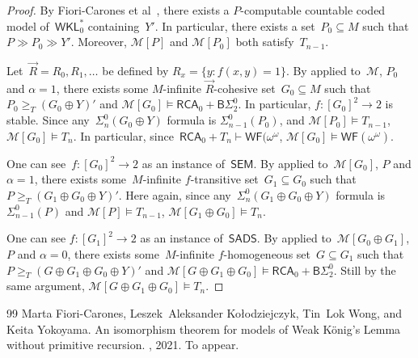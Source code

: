 \documentclass{article}
\numberwithin{theorem}{section}
\newcommand{\RCA}{\mathsf{RCA}}
\newcommand{\WKL}{\mathsf{WKL}}
\newcommand{\SEM}{\mathsf{SEM}}
\newcommand{\SADS}{\mathsf{SADS}}
\newcommand{\BSig}{\mathsf{B}\Sigma^0}
\newcommand{\WF}{\mathsf{WF}}
\newcommand{\M}{\mathcal{M}}
\begin{document}
\begin{proof}
By Fiori-Carones et al~\cite[Lemma 3.2]{fiori2021isomorphism}, there exists a $P$-computable countable coded model of~$\WKL_0^*$ containing~$Y'$.
In particular, there exists a set~$P_0 \subseteq M$ such that $P \gg P_0 \gg Y'$. Moreover, $\M[P]$ and $\M[P_0]$ both satisfy~$T_{n-1}$.

Let~$\vec{R} = R_0, R_1, \dots$ be defined by $R_x = \{ y : f(x, y) = 1 \}$.
By  applied to~$\M$, $P_0$ and $\alpha = 1$, there exists some $M$-infinite $\vec{R}$-cohesive set~$G_0 \subseteq M$ such that $P_0 \geq_T (G_0 \oplus Y)'$ and $\M[G_0] \models \RCA_0 + \BSig_2$.  In particular, $f : [G_0]^2 \to 2$ is stable.
Since any~$\Sigma^0_n(G_0 \oplus Y)$ formula is $\Sigma^0_{n-1}(P_0)$, and $\M[P_0] \models T_{n-1}$, $\M[G_0] \models T_n$. In particular, since~$\RCA_0 + T_n \vdash \WF(\omega^\omega$, $\M[G_0] \models \WF(\omega^\omega)$.

One can see~$f : [G_0]^2 \to 2$ as an instance of~$\SEM$.
By  applied to~$\M[G_0]$, $P$ and $\alpha = 1$, there exists some~$M$-infinite $f$-transitive set~$G_1 \subseteq G_0$ such that $P \geq_T (G_1 \oplus G_0 \oplus Y)'$.
Here again, since any~$\Sigma^0_n(G_1 \oplus G_0 \oplus Y)$ formula is $\Sigma^0_{n-1}(P)$ and $\M[P] \models T_{n-1}$, $\M[G_1 \oplus G_0] \models T_n$. 

One can see $f : [G_1]^2 \to 2$ as an instance of~$\SADS$.
By  applied to~$\M[G_0 \oplus G_1]$, $P$ and $\alpha = 0$, there exists some~$M$-infinite $f$-homogeneous set~$G \subseteq G_1$ such that $P \geq_T (G \oplus G_1 \oplus G_0 \oplus Y)'$ and $\M[G \oplus G_1 \oplus G_0] \models \RCA_0 + \BSig_2$.
Still by the same argument, $\M[G \oplus G_1 \oplus G_0] \models T_n$.
\end{proof}

\begin{thebibliography}{99}
Marta Fiori-Carones, Leszek~Aleksander Ko{\l}odziejczyk, Tin~Lok Wong, and
  Keita Yokoyama.
\newblock An isomorphism theorem for models of {W}eak {K}\"onig's {L}emma
  without primitive recursion.
, 2021.
\newblock To appear.
\end{thebibliography}
\end{document}
